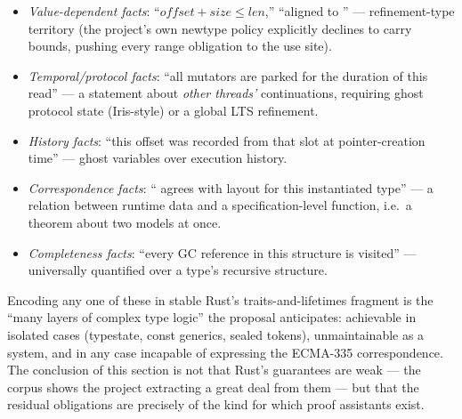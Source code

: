 \begin{itemize}[leftmargin=1.4em]
\item \emph{Value-dependent facts}: ``$\mathit{offset} + \mathit{size}
  \le \mathit{len}$,'' ``aligned to '' ---
  refinement-type territory (the project's own newtype policy
  explicitly declines to carry bounds, pushing every range obligation
  to the use site).
\item \emph{Temporal/protocol facts}: ``all mutators are parked for the
  duration of this read'' --- a statement about \emph{other threads'}
  continuations, requiring ghost protocol state (Iris-style) or a
  global LTS refinement.
\item \emph{History facts}: ``this offset was recorded from that slot
  at pointer-creation time'' --- ghost variables over execution history.
\item \emph{Correspondence facts}: `` agrees with
   layout for this instantiated type'' --- a relation
  between runtime data and a specification-level function, i.e.\ a
  theorem about two models at once.
\item \emph{Completeness facts}: ``every GC reference in this structure
  is visited'' --- universally quantified over a type's recursive
  structure.
\end{itemize}

Encoding any one of these in stable Rust's traits-and-lifetimes
fragment is the ``many layers of complex type logic'' the proposal
anticipates: achievable in isolated cases (typestate, const generics,
sealed tokens), unmaintainable as a system, and in any case incapable
of expressing the ECMA-335 correspondence. The conclusion of this
section is not that Rust's guarantees are weak --- the corpus shows the
project extracting a great deal from them --- but that the residual
obligations are precisely of the kind for which proof assistants
exist.
